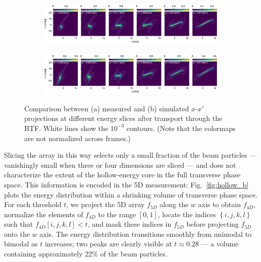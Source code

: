 \documentclass[letterpaper,
               keeplastbox,
               nospread,
               biblatex,
              ]{jacow}
\begin{document}
%
\begin{figure}[!t]
    \centering
    \vfill
    \vfill
    \begin{subfigure}{\textwidth}
        \includegraphics[width=\textwidth]{fig4a.pdf}
        \caption{}
        \label{fig:VS34_c}
    \end{subfigure}
    \vfill
    \vfill
    \begin{subfigure}{\textwidth}
        \includegraphics[width=\textwidth]{fig4b.pdf}
        \caption{}
        \label{fig:VS34_d}
    \end{subfigure}
    \caption{Comparison between (a) measured and (b) simulated $x$-$x'$ projections at different energy slices after transport through the BTF. White lines show the $10^{-3}$ contours. (Note that the colormaps are not normalized across frames.)}
    \label{fig:VS34}
\end{figure}
%

Slicing the array in this way selects only a small fraction of the beam particles — vanishingly small when three or four dimensions are sliced — and does not characterize the extent of the hollow-energy core in the full transverse phase space. This information is encoded in the 5D measurement: Fig.~\ref{fig:hollow_b} plots the energy distribution within a shrinking volume of transverse phase space. For each threshold $t$, we project the 5D array $f_{5D}$ along the $w$ axis to obtain $f_{4D}$, normalize the elements of $f_{4D}$ to the range $[0, 1]$, locate the indices $\left\{i, j, k, l\right\}$ such that $f_{4D}[i, j, k, l] < t$, and mask these indices in $f_{5D}$ before projecting $f_{5D}$ onto the $w$ axis. The energy distribution transitions smoothly from unimodal to bimodal as $t$ increases; two peaks are clearly visible at $t \approx 0.28$ — a volume containing approximately 22\% of the beam particles.
\end{document}
